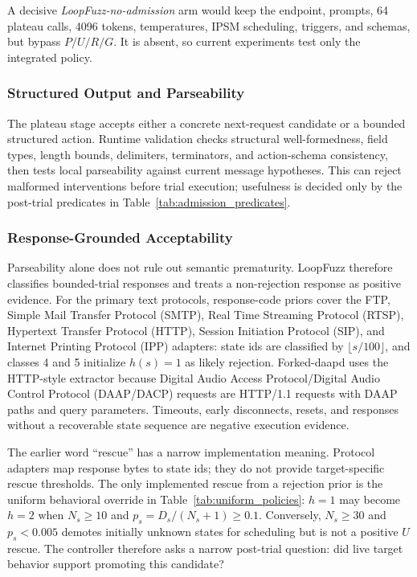 \documentclass[final,5p,times,number]{elsarticle}
\begin{document}
A decisive \emph{LoopFuzz-no-admission} arm would keep the endpoint, prompts, 64 plateau calls, 4096 tokens, temperatures, IPSM scheduling, triggers, and schemas, but bypass $P/U/R/G$. It is absent, so current experiments test only the integrated policy.

\subsubsection{Structured Output and Parseability}
The plateau stage accepts either a concrete next-request candidate or a bounded structured action. Runtime validation checks structural well-formedness, field types, length bounds, delimiters, terminators, and action-schema consistency, then tests local parseability against current message hypotheses. This can reject malformed interventions before trial execution; usefulness is decided only by the post-trial predicates in Table~\ref{tab:admission_predicates}.

\subsubsection{Response-Grounded Acceptability}
Parseability alone does not rule out semantic prematurity. LoopFuzz therefore classifies bounded-trial responses and treats a non-rejection response as positive evidence. For the primary text protocols, response-code priors cover the FTP, Simple Mail Transfer Protocol (SMTP), Real Time Streaming Protocol (RTSP), Hypertext Transfer Protocol (HTTP), Session Initiation Protocol (SIP), and Internet Printing Protocol (IPP) adapters: state ids are classified by $\lfloor s/100\rfloor$, and classes 4 and 5 initialize $h(s)=1$ as likely rejection. Forked-daapd uses the HTTP-style extractor because Digital Audio Access Protocol/Digital Audio Control Protocol (DAAP/DACP) requests are HTTP/1.1 requests with DAAP paths and query parameters. Timeouts, early disconnects, resets, and responses without a recoverable state sequence are negative execution evidence.

The earlier word ``rescue'' has a narrow implementation meaning. Protocol adapters map response bytes to state ids; they do not provide target-specific rescue thresholds. The only implemented rescue from a rejection prior is the uniform behavioral override in Table~\ref{tab:uniform_policies}: $h=1$ may become $h=2$ when $N_s\ge10$ and $p_s=D_s/(N_s+1)\ge0.1$. Conversely, $N_s\ge30$ and $p_s<0.005$ demotes initially unknown states for scheduling but is not a positive $U$ rescue. The controller therefore asks a narrow post-trial question: did live target behavior support promoting this candidate?
\end{document}
